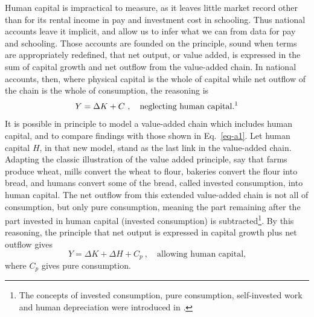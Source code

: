 \documentclass[a4paper,fleqn]{latex_styles/cas-sc}
\begin{document}
Human capital is impractical to measure, as it leaves little market
record other than for its rental income in pay and investment cost in schooling. Thus national accounts
leave it implicit, and allow us to infer what we can from data for pay and schooling. Those
accounts are founded on the principle, sound when terms are appropriately redefined, that net output,
or value added, is expressed in the sum of capital growth and net
outflow from the value-added chain. In national accounts, then, where
physical capital is the whole of capital while net outflow of the chain
is the whole of consumption, the reasoning is
%
\begin{equation}
Y = \Delta K + C \ , \quad \text{neglecting human capital.\footnotemark}\label{eq-a1}
\end{equation}
%
It is possible in principle to model a value-added chain which includes human
capital, and to compare findings with those shown in Eq.~\eqref{eq-a1}.
Let human capital $H$, in that new model, stand as the last link in the
value-added chain. Adapting the classic illustration of the value added
principle, say that farms produce wheat, mills convert the wheat to
flour, bakeries convert the flour into bread, and humans convert some of
the bread, called invested consumption, into human capital. The net
outflow from this extended value-added chain is not all of consumption,
but only pure consumption, meaning the part remaining after the part invested in human capital (invested consumption) is
subtracted\footnote{The concepts of invested consumption, pure consumption, self-invested work and human depreciation were introduced in \cite{schultzInvestmentHumanCapital1961}.}. By this reasoning, the principle
that net output is expressed in capital growth plus net outflow gives
%
\begin{equation} 
Y = \Delta K + \Delta H + C_{p}\ , \quad \text{allowing human capital,}\label{eq-a2} 
\end{equation}
%
where \(C_{p}\) gives pure consumption.
\end{document}

